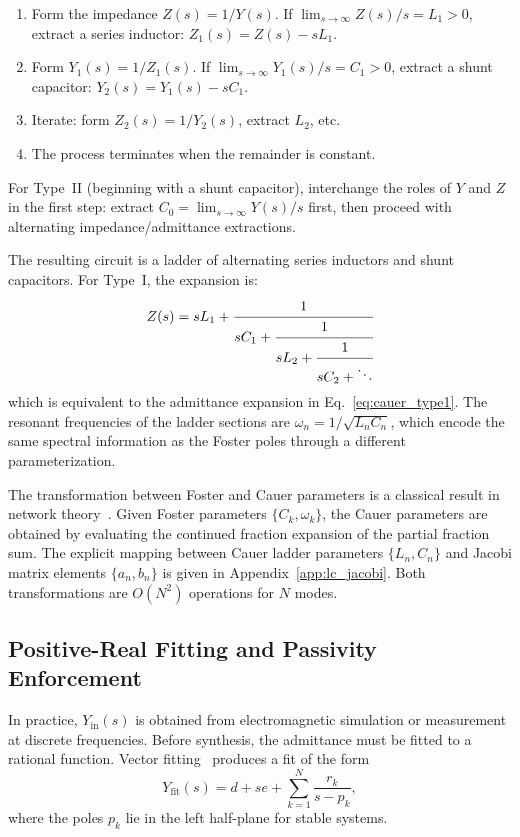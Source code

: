 \documentclass[reprint, floatfix, superscriptaddress, amsmath, amssymb, longbibliography]{revtex4-2}
\begin{document}
\begin{enumerate}
\item Form the impedance $Z(s) = 1/Y(s)$. If $\lim_{s \to \infty} Z(s)/s = L_1 > 0$, extract a series inductor: $Z_1(s) = Z(s) - sL_1$.
\item Form $Y_1(s) = 1/Z_1(s)$. If $\lim_{s \to \infty} Y_1(s)/s = C_1 > 0$, extract a shunt capacitor: $Y_2(s) = Y_1(s) - sC_1$.
\item Iterate: form $Z_2(s) = 1/Y_2(s)$, extract $L_2$, etc.
\item The process terminates when the remainder is constant.
\end{enumerate}

For Type~II (beginning with a shunt capacitor), interchange the roles of $Y$ and $Z$ in the first step: extract $C_0 = \lim_{s \to \infty} Y(s)/s$ first, then proceed with alternating impedance/admittance extractions.

The resulting circuit is a ladder of alternating series inductors and shunt capacitors. For Type~I, the expansion is:
\begin{equation}
Z(s) = sL_1 + \cfrac{1}{sC_1 + \cfrac{1}{sL_2 + \cfrac{1}{sC_2 + \ddots}}}
\end{equation}
which is equivalent to the admittance expansion in Eq.~\eqref{eq:cauer_type1}. The resonant frequencies of the ladder sections are $\omega_n = 1/\sqrt{L_n C_n}$, which encode the same spectral information as the Foster poles through a different parameterization.

The transformation between Foster and Cauer parameters is a classical result in network theory~\cite{Guillemin1957}. Given Foster parameters $\{C_k, \omega_k\}$, the Cauer parameters are obtained by evaluating the continued fraction expansion of the partial fraction sum. The explicit mapping between Cauer ladder parameters $\{L_n, C_n\}$ and Jacobi matrix elements $\{a_n, b_n\}$ is given in Appendix~\ref{app:lc_jacobi}. Both transformations are $O(N^2)$ operations for $N$ modes.

\subsection{Positive-Real Fitting and Passivity Enforcement}
\label{sec:passivity}

In practice, $Y_{\mathrm{in}}(s)$ is obtained from electromagnetic simulation or measurement at discrete frequencies. Before synthesis, the admittance must be fitted to a rational function. Vector fitting~\cite{Gustavsen1999} produces a fit of the form
\begin{equation}
Y_{\mathrm{fit}}(s) = d + se + \sum_{k=1}^{N} \frac{r_k}{s - p_k},
\label{eq:vector_fit}
\end{equation}
where the poles $p_k$ lie in the left half-plane for stable systems.
\end{document}
